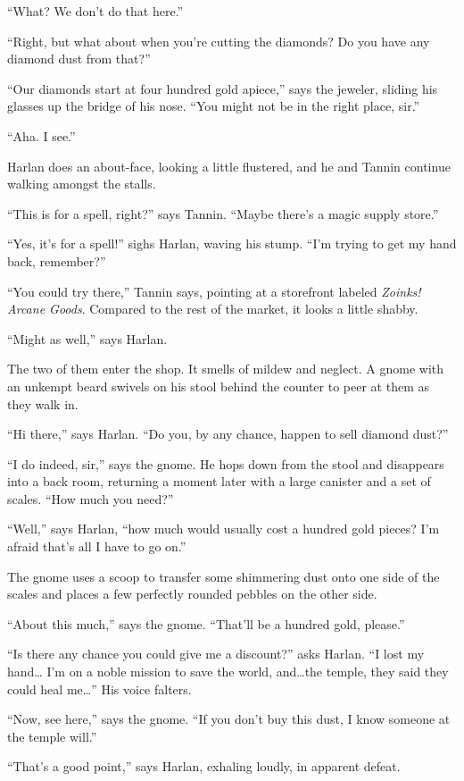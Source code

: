\documentclass[smalldemyvopaper,11pt,twoside,onecolumn,openright,extrafontsizes]{memoir}
\begin{document}
``What? We don't do that here.''

``Right, but what about when you're cutting the diamonds? Do you have
any diamond dust from that?''

``Our diamonds start at four hundred gold apiece,'' says the jeweler,
sliding his glasses up the bridge of his nose. ``You might not be in the
right place, sir.''

``Aha. I see.''

Harlan does an about-face, looking a little flustered, and he and Tannin
continue walking amongst the stalls.

``This is for a spell, right?'' says Tannin. ``Maybe there's a magic
supply store.''

``Yes, it's for a spell!'' sighs Harlan, waving his stump. ``I'm trying
to get my hand back, remember?''

``You could try there,'' Tannin says, pointing at a storefront labeled
\emph{Zoinks! Arcane Goods}. Compared to the rest of the market, it
looks a little shabby.

``Might as well,'' says Harlan.

The two of them enter the shop. It smells of mildew and neglect. A gnome
with an unkempt beard swivels on his stool behind the counter to peer at
them as they walk in.

``Hi there,'' says Harlan. ``Do you, by any chance, happen to sell
diamond dust?''

``I do indeed, sir,'' says the gnome. He hops down from the stool and
disappears into a back room, returning a moment later with a large
canister and a set of scales. ``How much you need?''

``Well,'' says Harlan, ``how much would usually cost a hundred gold
pieces? I'm afraid that's all I have to go on.''

The gnome uses a scoop to transfer some shimmering dust onto one side of
the scales and places a few perfectly rounded pebbles on the other side.

``About this much,'' says the gnome. ``That'll be a hundred gold,
please.''

``Is there any chance you could give me a discount?'' asks Harlan. ``I
lost my hand\ldots{} I'm on a noble mission to save the world,
and\ldots the temple, they said they could heal me\ldots{}'' His voice
falters.

``Now, see here,'' says the gnome. ``If you don't buy this dust, I know
someone at the temple will.''

``That's a good point,'' says Harlan, exhaling loudly, in apparent
defeat.
\end{document}
